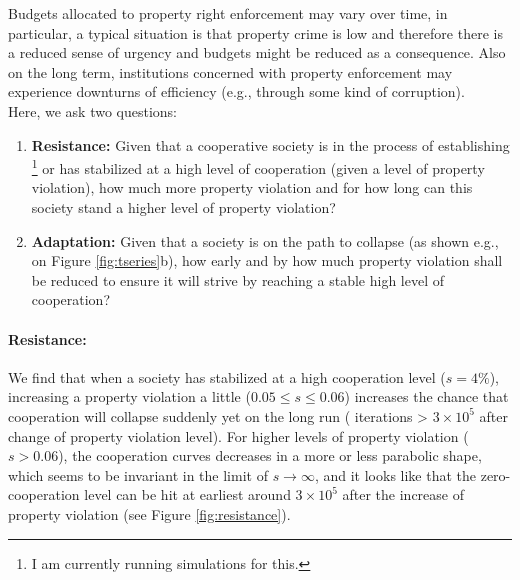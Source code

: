 Budgets allocated to property right enforcement may vary over time, in particular, a typical situation is that property crime is low and therefore there is a reduced sense of urgency and budgets might be reduced as a consequence. Also on the long term, institutions concerned with property enforcement may experience downturns of efficiency (e.g., through some kind of corruption).\\

Here, we ask two questions:  

\begin{enumerate}
  \item {\bf Resistance:} Given that a cooperative society is in the process of establishing \footnote{I am currently running simulations for this.} or has stabilized at a high level of cooperation (given a level of property violation), how much more property violation and for how long can this society stand a higher level of property violation?
  \item {\bf Adaptation:} Given that a society is on the path to collapse (as shown e.g., on Figure \ref{fig:tseries}b), how early and by how much property violation shall be reduced to ensure it will strive by reaching a stable high level of cooperation?
\end{enumerate}

\paragraph{Resistance:} We find that when a society has stabilized at a high cooperation level ($s=4\%$), increasing a property violation a little ($0.05 \leqslant s \leqslant 0.06$) increases the chance that cooperation will collapse suddenly yet on the long run ( iterations > $3 \times 10^5$ after change of property violation level). For higher levels of  property violation ($s>0.06$), the cooperation curves decreases in a more or less parabolic shape, which seems to be invariant in the limit of $s \rightarrow \infty$, and it looks like that the zero-cooperation level can be hit at earliest around $3 \times 10^5$ after the increase of property violation (see Figure \ref{fig:resistance}).

